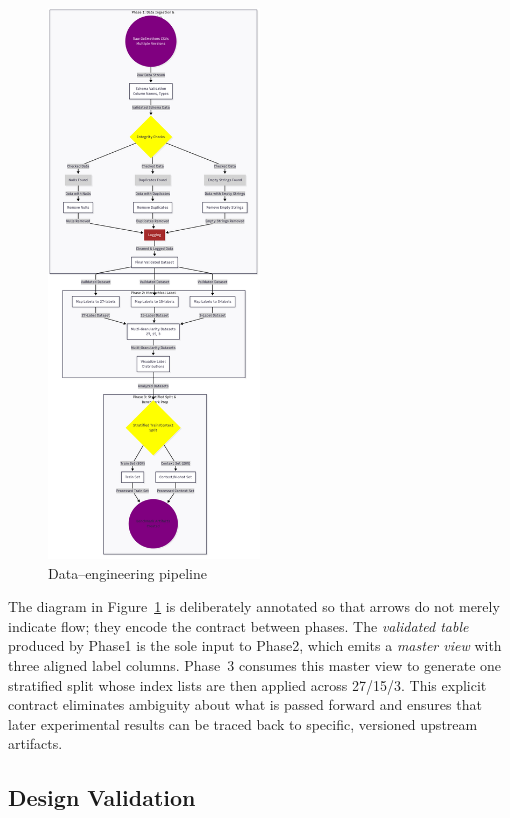 \begin{figure}[H]
  \centering
  \includegraphics[width=0.5\textwidth]{Images/DataEngineeringPipeline.png}
  \caption{Data--engineering pipeline}
  \label{fig:de-pipeline}
\end{figure}
\newpage
The diagram in Figure~\ref{fig:de-pipeline} is deliberately annotated so that arrows do not merely indicate flow; they encode the contract between phases. The \emph{validated table} produced by Phase1 is the sole input to Phase2, which emits a \emph{master view} with three aligned label columns. Phase~3 consumes this master view to generate one stratified split whose index lists are then applied across 27/15/3. This explicit contract eliminates ambiguity about what is passed forward and ensures that later experimental results can be traced back to specific, versioned upstream artifacts.

\subsection{Design Validation}

